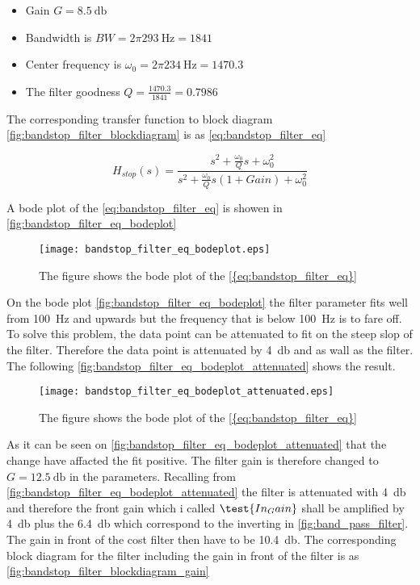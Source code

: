 \begin{itemize}
\item Gain $G = \SI{8.5}{\decibel}$
\item Bandwidth is $BW = 2\pi \SI{293}{\hertz} = 1841$
\item Center frequency is $\omega_0 = 2\pi \SI{234}{\hertz} = 1470.3$
\item The filter goodness $Q = \frac{1470.3}{1841} = 0.7986$
\end{itemize}

The corresponding transfer function to block diagram \autoref{fig:bandstop_filter_blockdiagram} is as \autoref{eq:bandstop_filter_eq}

\begin{equation}\label{eq:bandstop_filter_eq}
H_{stop}(s) = \frac{s^2+\frac{\omega_0}{Q}s+\omega_0^2}{s^2+\frac{\omega_0}{Q}s(1+Gain)+\omega_0^2}
\end{equation}

A bode plot of the \autoref{eq:bandstop_filter_eq} is showen in \autoref{fig:bandstop_filter_eq_bodeplot}



\begin{figure}[H]
	\centering
	\texttt{[image: bandstop\_filter\_eq\_bodeplot.eps]}
	\caption{The figure shows the bode plot of the \autoref{{eq:bandstop_filter_eq}}}
		\label{fig:bandstop_filter_eq_bodeplot}
\end{figure}

On the bode plot  \autoref{fig:bandstop_filter_eq_bodeplot} the filter parameter fits well from \SI{100}{\hertz} and upwards but the frequency that is below \SI{100}{\hertz} is to fare off. To solve this problem, the data point can be attenuated to fit on the steep slop of the filter. Therefore the data point is attenuated by \SI{4}{\decibel} and as wall as the filter. The following \autoref{fig:bandstop_filter_eq_bodeplot_attenuated} shows the result.

\begin{figure}[H]
	\centering
	\texttt{[image: bandstop\_filter\_eq\_bodeplot\_attenuated.eps]}
	\caption{The figure shows the bode plot of the \autoref{{eq:bandstop_filter_eq}}}
		\label{fig:bandstop_filter_eq_bodeplot_attenuated}
\end{figure}


As it can be seen on \autoref{fig:bandstop_filter_eq_bodeplot_attenuated} that the change have affacted the fit positive. The filter gain is therefore changed to  $G = \SI{12.5}{\decibel}$ in the parameters. Recalling from \autoref{fig:bandstop_filter_eq_bodeplot_attenuated} the filter is attenuated with \SI{4}{\decibel} and therefore the front gain which i called $\test{In_Gain}$ shall be amplified by \SI{4}{\decibel} plus the \SI{6.4}{\decibel} which correspond to the inverting in \autoref{fig:band_pass_filter}. The gain in front of the cost filter then have to be \SI{10.4}{\decibel}. The corresponding block diagram for the filter including the gain in front of the filter is as \autoref{fig:bandstop_filter_blockdiagram_gain}

